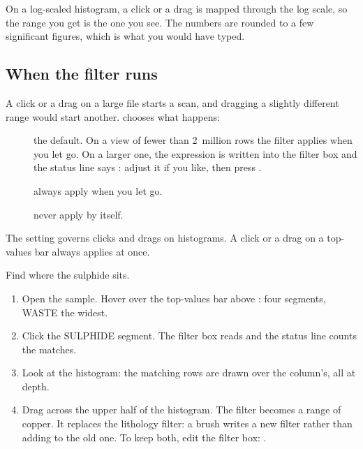 On a log-scaled histogram, a click or a drag is mapped through the log scale, so the range you get is the
one you see. The numbers are rounded to a few significant figures, which is what you would have typed.

\subsection{When the filter runs}\label{sec:brush-modes}

A click or a drag on a large file starts a scan, and dragging a slightly different range would start
another.  chooses what happens:

\begin{description}
\item[] the default. On a view of fewer than 2~million rows the
filter applies when you let go. On a larger one, the expression is written into the filter box and the
status line says : adjust it if you like, then press
.
\item[] always apply when you let go.
\item[] never apply by itself.
\end{description}

The setting governs clicks and drags on histograms. A click or a drag on a top-values bar always applies
at once.

\begin{tryit}
Find where the sulphide sits.
\begin{enumerate}
\item Open the sample. Hover over the top-values bar above : four segments, WASTE the widest.
\item Click the SULPHIDE segment. The filter box reads  and the status line
counts the matches.
\item Look at the  histogram: the matching rows are drawn over the column's, all at depth.
\item Drag across the upper half of the  histogram. The filter becomes a range of copper.
It replaces the lithology filter: a brush writes a new filter rather than adding to the old one. To keep
both, edit the filter box: .
\end{enumerate}
\end{tryit}
